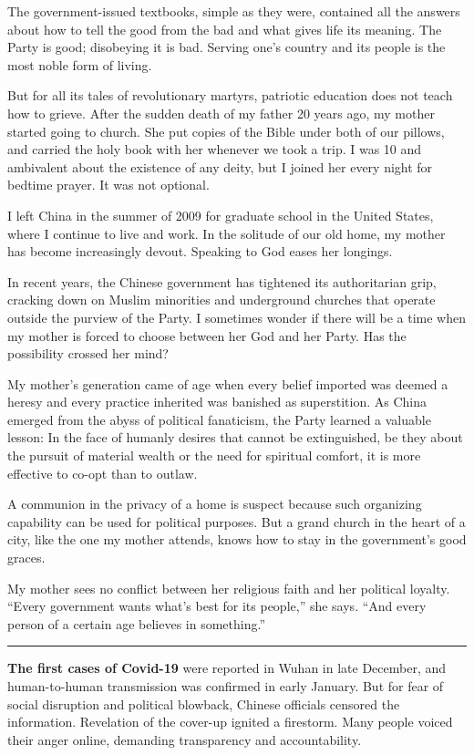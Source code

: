The government-issued textbooks, simple as they were, contained all the
answers about how to tell the good from the bad and what gives life its
meaning. The Party is good; disobeying it is bad. Serving one's country
and its people is the most noble form of living.

But for all its tales of revolutionary martyrs, patriotic education does
not teach how to grieve. After the sudden death of my father 20 years
ago, my mother started going to church. She put copies of the Bible
under both of our pillows, and carried the holy book with her whenever
we took a trip. I was 10 and ambivalent about the existence of any
deity, but I joined her every night for bedtime prayer. It was not
optional.

I left China in the summer of 2009 for graduate school in the United
States, where I continue to live and work. In the solitude of our old
home, my mother has become increasingly devout. Speaking to God eases
her longings.

In recent years, the Chinese government has tightened its authoritarian
grip, cracking down on Muslim minorities and underground churches that
operate outside the purview of the Party. I sometimes wonder if there
will be a time when my mother is forced to choose between her God and
her Party. Has the possibility crossed her mind?

My mother's generation came of age when every belief imported was deemed
a heresy and every practice inherited was banished as superstition. As
China emerged from the abyss of political fanaticism, the Party learned
a valuable lesson: In the face of humanly desires that cannot be
extinguished, be they about the pursuit of material wealth or the need
for spiritual comfort, it is more effective to co-opt than to outlaw.

A communion in the privacy of a home is suspect because such organizing
capability can be used for political purposes. But a grand church in the
heart of a city, like the one my mother attends, knows how to stay in
the government's good graces.

My mother sees no conflict between her religious faith and her political
loyalty. ``Every government wants what's best for its people,'' she
says. ``And every person of a certain age believes in something.''

\begin{center}\rule{0.5\linewidth}{\linethickness}\end{center}

\textbf{The first cases of Covid-19} were reported in Wuhan in late
December, and human-to-human transmission was confirmed in early
January. But for fear of social disruption and political blowback,
Chinese officials censored the information. Revelation of the cover-up
ignited a firestorm. Many people voiced their anger online, demanding
transparency and accountability.


